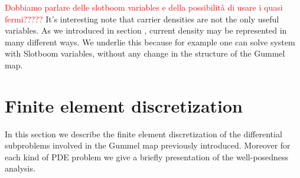 \textcolor{red}{Dobbiamo parlare delle slotboom variables e della possibilità di usare i quasi fermi?????}
It's interesting note that carrier densities are not the only useful variables. As we introduced in section , current density may be represented in many different ways.  We underlie this because for example one can solve system  with Slotboom variables, without any change in the structure of the Gummel map.


\section{Finite element discretization}

In this section we describe the finite element discretization of the differential subproblems involved in the Gummel map previously introduced. Moreover for each kind of PDE problem we give a briefly presentation of the well-posedness analysis. 



